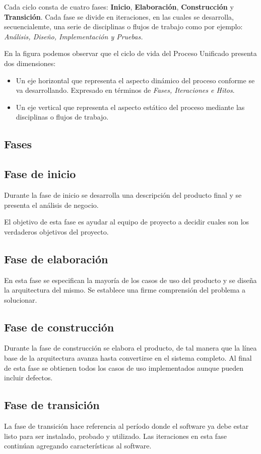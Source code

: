 Cada ciclo consta de cuatro fases: \textbf{Inicio}, \textbf{Elaboración}, \textbf{Construcción} y \textbf{Transición}. Cada fase se divide en iteraciones, en las cuales se desarrolla, secuencialemte, una serie de disciplinas o flujos de trabajo como por ejemplo: \textit{Análisis, Diseño, Implementación y Pruebas.}

En la figura podemos observar que el ciclo de vida del Proceso Unificado presenta dos dimensiones:
\begin{itemize}
	\item Un eje horizontal que representa el aspecto dinámico del proceso conforme se va desarrollando. Expresado en términos de \textit{Fases, Iteraciones e Hitos}.
	\item Un eje vertical que representa el aspecto estático del proceso mediante las disciplinas o flujos de trabajo.
\end{itemize}


\subsection{Fases}

\subsection{Fase de inicio}
Durante la fase de inicio se desarrolla una descripción del producto final y se presenta el análisis de negocio.

El objetivo de esta fase es ayudar al equipo de proyecto a decidir cuales son los verdaderos objetivos del proyecto.

\subsection{Fase de elaboración}
En esta fase se especifican la mayoría de los casos de uso del producto y se diseña la arquitectura del mismo. Se establece una firme comprensión del problema a solucionar.


\subsection{Fase de construcción}
Durante la fase de construcción se elabora el producto, de tal manera que la línea base de la arquitectura avanza hasta convertirse en el sistema completo. Al final de esta fase se obtienen todos los casos de uso implementados aunque pueden incluir defectos.


\subsection{Fase de transición}
La fase de transición hace referencia al período donde el software ya debe estar listo para ser instalado, probado y utilizado. Las iteraciones en esta fase continúan agregando características al software.


